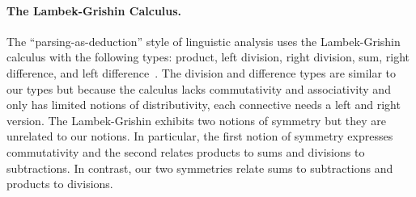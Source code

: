 \documentclass[preprint]{sigplanconf}
\begin{document}
\paragraph*{The Lambek-Grishin Calculus.} The ``parsing-as-deduction'' style
of linguistic analysis uses the Lambek-Grishin calculus with the following
types: product, left division, right division, sum, right difference, and
left difference~\cite{Bernardi:2010:CSL:1749618.1749689}. The division and
difference types are similar to our types but because the calculus lacks
commutativity and associativity and only has limited notions of
distributivity, each connective needs a left and right version. The
Lambek-Grishin exhibits two notions of symmetry but they are unrelated to our
notions. In particular, the first notion of symmetry expresses commutativity
and the second relates products to sums and divisions to subtractions. In
contrast, our two symmetries relate sums to subtractions and products to
divisions.
\end{document}
